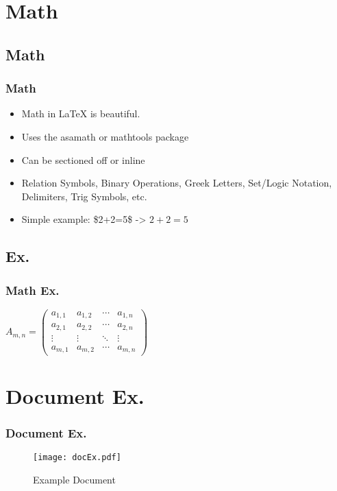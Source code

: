 \section{Math}

\subsection{Math}

\begin{frame}
\frametitle{Math}
\begin{itemize}
    \item Math in \LaTeX{} is beautiful.
    \item Uses the asamath or mathtools package
    \item Can be sectioned off or inline
    \item Relation Symbols, Binary Operations, Greek Letters, Set/Logic
        Notation, Delimiters, Trig Symbols, etc.
    \item Simple example: \$2+2=5\$ -> $2+2=5$
\end{itemize}
\end{frame}

\subsection{Ex.}

\begin{frame}
\frametitle{Math Ex.}
\begin{math}
A_{m,n} =
 \begin{pmatrix}
  a_{1,1} & a_{1,2} & \cdots & a_{1,n} \\
  a_{2,1} & a_{2,2} & \cdots & a_{2,n} \\
  \vdots  & \vdots  & \ddots & \vdots  \\
  a_{m,1} & a_{m,2} & \cdots & a_{m,n}
 \end{pmatrix}
 \end{math}
\end{frame}


\section{Document Ex.}

\begin{frame}
\frametitle{Document Ex.}
\begin{figure}[DocEx] 
  \begin{centering}
  \texttt{[image: docEx.pdf]}
  \caption{Example Document}
  \end{centering}
\end{figure}
\end{frame}
